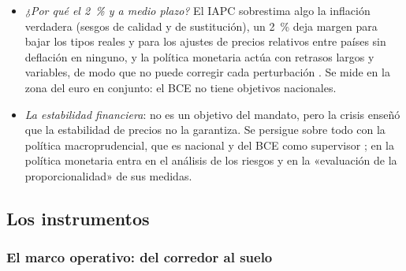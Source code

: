 \documentclass[11pt]{article}
\begin{document}
\begin{itemize}
\begin{itemize}
  \end{itemize}
\item \emph{¿Por qué el 2~\% y a medio plazo?} El IAPC sobrestima algo la inflación verdadera (sesgos de calidad y de sustitución), un 2~\% deja margen para bajar los tipos reales y para los ajustes de precios relativos entre países sin deflación en ninguno, y la política monetaria actúa con retrasos largos y variables, de modo que no puede corregir cada perturbación . Se mide en la zona del euro en conjunto: el BCE no tiene objetivos nacionales.
\item \emph{La estabilidad financiera}: no es un objetivo del mandato, pero la crisis enseñó que la estabilidad de precios no la garantiza. Se persigue sobre todo con la política macroprudencial, que es nacional y del BCE como supervisor ; en la política monetaria entra en el análisis de los riesgos y en la «evaluación de la proporcionalidad» de sus medidas.
\end{itemize}

\subsection{Los instrumentos}\label{sec:instrumentos}

\subsubsection{El marco operativo: del corredor al suelo}\label{sec:marco-operativo}
\end{document}
